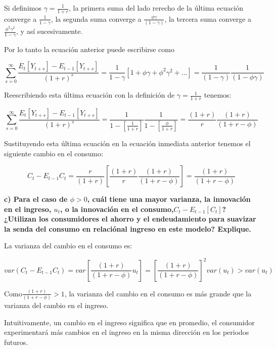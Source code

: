 \documentclass[
]{article}
\begin{document}
Si definimos \(\gamma =\frac{1}{1+r}\), la primera suma del lado rerecho
de la última ecuación converge a \(\frac{1}{1-\gamma}\), la segunda suma
converge a \(\frac{\phi \gamma}{(1-\gamma)}\), la tercera suma converge
a \(\frac{\phi^2 \gamma^2}{1-\gamma}\), y así sucesivamente.

Por lo tanto la ecuación anterior puede escribirse como

\begin{equation}
\sum^\infty_{s=0}\frac{E_t[Y_{t+s}]-E_{t-1}[Y_{t+s}]}{(1+r)^s}=\frac{1}{1-\gamma}[1+\phi \gamma+\phi^2 \gamma^2+...]=\frac{1}{(1-\gamma)} \frac{1}{(1-\phi \gamma)}
\end{equation}

Reescribiendo esta última ecuación con la definición de
\(\gamma =\frac{1}{1+r}\) tenemos:

\begin{equation}
\sum^\infty_{s=0}\frac{E_t[Y_{t+s}]-E_{t-1}[Y_{t+s}]}{(1+r)^s}=\frac{1}{1-[\frac{1}{1+r}]}\frac{1}{1-[\frac{\phi}{1+r}]}=\frac{(1+r)}{r}\frac{(1+r)}{(1+r-\phi)}
\end{equation}

Sustituyendo esta última ecuación en la ecuación inmediata anterior
tenemos el siguiente cambio en el consumo:

\begin{equation}
C_t-E_{t-1}C_t=\frac{r}{(1+r)}[\frac{(1+r)}{r}\frac{(1+r)}{(1+r-\phi)}]=\frac{(1+r)}{(1+r-\phi)}
\end{equation}

\textbf{c) Para el caso de \(\phi >0\), cuál tiene una mayor varianza,
la innovación en el ingreso, \(u_t\), o la innovación en el
consumo,\(C_t-E_{t-1}[C_t]\)? ¿Utilizan los consumidores el ahorro y el
endeudamiento para suavizar la senda del consumo en relaciónal ingreso
en este modelo? Explique.}

La varianza del cambio en el consumo es:

\begin{equation}
var(C_t-E_{t-1}C_t)=var[\frac{(1+r)}{(1+r-\phi)}u_t]=[\frac{(1+r)}{(1+r-\phi)}]^2 var(u_t)>var(u_t)
\end{equation}

Como\(\frac{(1+r)}{(1+r-\phi)}>1\), la varianza del cambio en el consumo
es más grande que la varianza del cambio en el ingreso.

Intuitivamente, un cambio en el ingreso significa que en promedio, el
consumidor experimentará más cambios en el ingreso en la misma dirección
en los periodos futuros.
\end{document}
